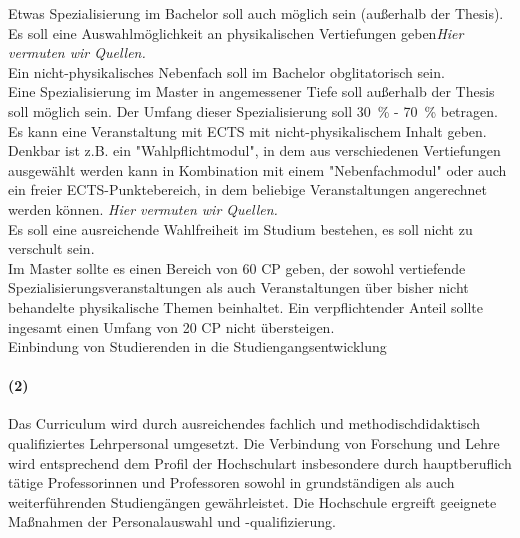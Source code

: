 \documentclass[a4paper]{scrartcl}
\begin{document}
\textcolor{Bernd}{\textbf{\cite{RESO: SoSe2002-RL}} Etwas Spezialisierung im Bachelor soll auch möglich sein (außerhalb der Thesis).}\\

\textcolor{Bernd}{Es soll eine Auswahlmöglichkeit an physikalischen Vertiefungen geben}\textcolor{Brutus}{\emph{Hier vermuten wir Quellen.}}\\

\textcolor{Bernd}{\textbf{\cite{RESO: SoSe2002-RL}} Ein nicht-physikalisches Nebenfach soll im Bachelor obglitatorisch sein.}\\

\textcolor{Bernd}{\textbf{\cite{RESO: SoSe2002-RL}} Eine Spezialisierung im Master in angemessener Tiefe soll außerhalb der Thesis soll möglich sein. Der Umfang dieser Spezialisierung soll 30~\% - 70~\% betragen.}\\

\textcolor{Bernd}{ Es kann eine Veranstaltung mit ECTS mit nicht-physikalischem Inhalt geben. Denkbar ist z.B. ein "Wahlpflichtmodul", in dem aus verschiedenen Vertiefungen ausgewählt werden kann in Kombination mit einem "Nebenfachmodul" oder auch ein freier ECTS-Punktebereich, in dem beliebige Veranstaltungen angerechnet werden können.}
\textcolor{Brutus}{\emph{Hier vermuten wir Quellen.}}\\

\textcolor{Bernd}{\textbf{\cite{PROT: WiSe2015-RL}} Es soll eine ausreichende Wahlfreiheit im Studium bestehen, es soll nicht zu verschult sein.}\\

\textcolor{Bernd}{\textbf{\cite{RESO: SoSe2010-BaMa}} Im Master sollte es einen Bereich von 60 CP geben, der sowohl vertiefende Spezialisierungsveranstaltungen als auch Veranstaltungen über bisher nicht behandelte physikalische Themen beinhaltet. Ein verpflichtender Anteil sollte ingesamt einen Umfang von 20 CP nicht übersteigen.}\\

\textcolor{Bernd}{\textbf{\cite{PROT: WiSe2015-RL}} Einbindung von Studierenden in die Studiengangsentwicklung}

\paragraph{(2)} Das Curriculum wird durch ausreichendes fachlich und methodischdidaktisch qualifiziertes Lehrpersonal umgesetzt. Die Verbindung von Forschung und Lehre wird entsprechend dem Profil der Hochschulart insbesondere durch hauptberuflich tätige Professorinnen und Professoren sowohl in grundständigen als auch weiterführenden Studiengängen gewährleistet. Die Hochschule ergreift geeignete Maßnahmen der Personalauswahl und -qualifizierung.\\
\end{document}
